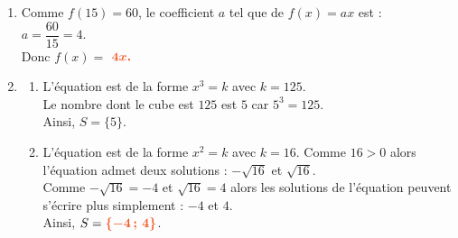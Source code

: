 \documentclass[a4paper,11pt]{article}
\begin{document}
\begin{seance}{}
\begin{enumerate}
\item  Comme $f(15)=60$, le coefficient $a$ tel que de $f(x)=ax$ est :\\$a=\dfrac{60}{15}=4$.\\Donc $f(x)=$ ${\color[HTML]{f15929}\boldsymbol{4x.}}$

\item \begin{enumerate}[itemsep=1em]
	\item L'équation est de la forme $x^3=k$ avec $k=125$. \\
              Le nombre dont le cube est $125$ est $5$ car $5^3=125$.\\
              Ainsi,   $S=\{5\}$.
              
	\item L'équation est de la forme $x^2=k$ avec $k=16$. Comme  $16>0$ alors l'équation admet deux solutions : $-\sqrt{16}$ et $\sqrt{16}$.\\
                Comme $-\sqrt{16}=-4$ et $\sqrt{16}=4$ alors
                les solutions de l'équation peuvent s'écrire plus simplement : $-4$ et $4$.\\
                Ainsi,  $S={\color[HTML]{f15929}\boldsymbol{\{-4\,;\,4\}}}$.
\end{enumerate}

\end{enumerate}

\end{seance}
\end{document}
